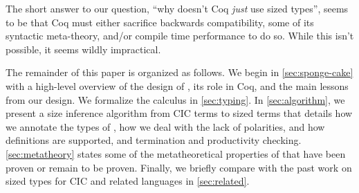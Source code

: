 The short answer to our question, ``why doesn't Coq \emph{just} use sized types'', seems to be that Coq must either sacrifice backwards compatibility, some of its syntactic meta-theory, and/or compile time performance to do so.
While this isn't possible, it seems wildly impractical.

The remainder of this paper is organized as follows.
We begin in \autoref{sec:sponge-cake} with a high-level overview of the design of \lang, its role in Coq, and the main lessons from our design.
We formalize the calculus \lang in \autoref{sec:typing}.
In \autoref{sec:algorithm}, we present a size inference algorithm from CIC terms to sized \lang terms that details how we annotate the types of \cofixpoints, how we deal with the lack of polarities, and how definitions are supported, and termination and productivity checking.
\autoref{sec:metatheory} states some of the metatheoretical properties of \lang that have been proven or remain to be proven.
Finally, we briefly compare with the past work on sized types for CIC and related languages in \autoref{sec:related}.

